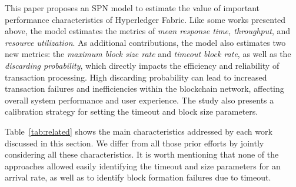 This paper proposes an SPN model to estimate the value of important performance characteristics of Hyperledger Fabric. 
Like some works presented above, the model estimates the metrics of \textit{mean response time, throughput}, and \textit{resource utilization}. 
As additional contributions, the model also estimates two new metrics: the \textit{maximum block size rate} and \textit{timeout block rate}, as well as the \textit{discarding probability}, which directly impacts the efficiency and reliability of transaction processing. 
High discarding probability can lead to increased transaction failures and inefficiencies within the blockchain network, affecting overall system performance and user experience. 
The study also presents a calibration strategy for setting the timeout and block size parameters.

Table~\ref{tab:related} shows the main characteristics addressed by each work discussed in this section. 
We differ from all those prior efforts by jointly considering all these characteristics. 
It is worth mentioning that none of the approaches allowed easily identifying the timeout and size parameters for an arrival rate, as well as to identify block formation failures due to timeout.

